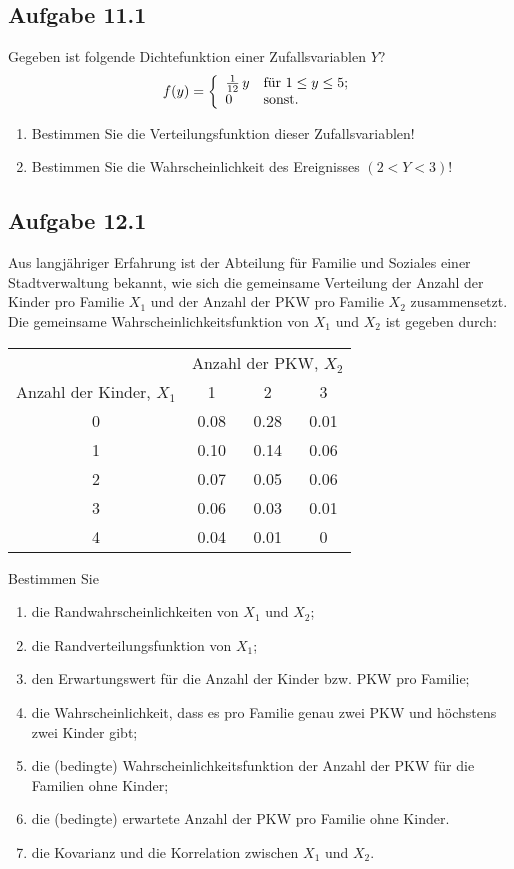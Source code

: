 \documentclass{article}
\begin{document}
	\subsection*{Aufgabe 11.1}
	Gegeben ist folgende Dichtefunktion einer Zufallsvariablen $Y$?
	\begin{equation*}
		f(y) = \left\{\begin{array}{l@{\quad}l}
			\frac{1}{12}\,y & \mbox{für $1 \le y \le 5$}; \\
			0 & \mbox{sonst}.
		\end{array} \right.
	\end{equation*}
	\begin{enumerate}[label = (\alph*)]
		\item Bestimmen Sie die Verteilungsfunktion dieser Zufallsvariablen!
		\item Bestimmen Sie die Wahrscheinlichkeit des Ereignisses $(2<Y<3)$!
	\end{enumerate}

	\subsection*{Aufgabe 12.1}
	Aus langjähriger Erfahrung ist der Abteilung für Familie und Soziales einer Stadtverwaltung bekannt, wie sich die gemeinsame Verteilung der Anzahl der Kinder pro Familie $X_1$ und der Anzahl der PKW pro Familie $X_2$ zusammensetzt. Die gemeinsame Wahrscheinlichkeitsfunktion von $X_1$ und $X_2$ ist gegeben durch:
	
	\begin{center}
		\begin{tabular}{c|ccc}
			\hline
			& \multicolumn{3}{c}{Anzahl der PKW, $X_2$} \\
			\cline{2-4}
			Anzahl der Kinder, $X_1$ & 1 & 2 & 3 \\
			\hline
			0 & 0.08 & 0.28 & 0.01 \\
			1 & 0.10 & 0.14 & 0.06 \\
			2 & 0.07 & 0.05 & 0.06 \\
			3 & 0.06 & 0.03 & 0.01 \\
			4 & 0.04 & 0.01 & 0\\
			\hline
		\end{tabular}
	\end{center}
	
	Bestimmen Sie
	\begin{enumerate}[label = (\alph*)]
		\item die Randwahrscheinlichkeiten von $X_1$ und $X_2$;
		\item die Randverteilungsfunktion von $X_1$;
		\item den Erwartungswert für die Anzahl der Kinder bzw. PKW pro Familie;
		\item die Wahrscheinlichkeit, dass es pro Familie genau zwei PKW und höchstens zwei Kinder gibt;
		\item die (bedingte) Wahrscheinlichkeitsfunktion der Anzahl der PKW für die Familien ohne Kinder;
		\item die (bedingte) erwartete Anzahl der PKW pro Familie ohne Kinder.
		\item die Kovarianz und die Korrelation zwischen $X_1$ und $X_2$.
	\end{enumerate}
\end{document}
